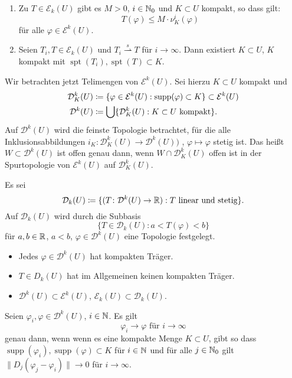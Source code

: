 \documentclass[a4paper,twoside,DIV15,BCOR12mm]{scrbook}
\DeclareMathOperator{\supp}{supp}
\DeclareMathOperator{\spt}{spt}
\begin{document}
\begin{lemma}
\label{lem:4.7}
\begin{enumerate}[\quad(a)]
\item Zu $T\in \mathcal E_k(U)$ gibt es $M>0$, $i\in\mathbb{N}_0$ und $K\subset U$ kompakt, so dass gilt:
\[
T(\varphi) \le M \cdot \nu_K^i (\varphi)
\]
für alle $\varphi\in\mathcal E^k(U)$.
\item Seien $T_i, T \in\mathcal E_k(U)$ und $T_i \stackrel{s}{\rightharpoonup} T$ für $i\to\infty$. Dann existiert $K\subset U$, $K$ kompakt mit $\spt(T_i), \spt(T) \subset K$.
\end{enumerate}
\end{lemma}

Wir betrachten jetzt Telimengen von $\mathcal E^k(U)$. Sei hierzu $K\subset U$ kompakt und
\begin{align*}
\mathcal D_K^k(U) &\da \{\varphi\in\mathcal E^k(U): \supp(\varphi) \subset K\} \subset \mathcal E^k(U) \\
\mathcal D^k(U) &\da \bigcup \{\mathcal D_K^k(U) : K\subset U \text{ kompakt}\}.
\end{align*}
Auf $\mathcal D^k(U)$ wird die feinste Topologie betrachtet, für die alle Inklusionsabbildungen $i_K\colon \mathcal D_K^k(U) \to \mathcal D^k(U))$ , $\varphi\mapsto\varphi$ stetig ist. Das heißt $W\subset \mathcal D^k(U)$ ist offen genau dann, wenn $W\cap \mathcal D_K^k(U)$ offen ist in der Spurtopologie von $\mathcal E^k(U)$ auf $\mathcal D_K^k(U)$.

\begin{definition}
Es sei
\[
\mathcal D_k(U) \da \{ (T\colon \mathcal D^k(U) \to \MdR) : \text{$T$ linear und stetig}\}.
\]
Auf $\mathcal D_k(U)$ wird durch die Subbasis
\[
\{T\in \mathcal D_k(U) : a < T(\varphi) < b\}
\]
für $a,b\in\mathbb{R}$, $a<b$, $\varphi\in\mathcal D^k(U)$ eine Topologie festgelegt.
\end{definition}

\begin{bemerkungenX}
\begin{itemize}
\item Jedes $\varphi\in \mathcal D^k(U)$ hat kompakten Träger.
\item $T\in D_k(U)$ hat im Allgemeinen keinen kompakten Träger.
\item $\mathcal D^k(U) \subset \mathcal E^k(U)$, $\mathcal E_k(U) \subset \mathcal D_k(U)$.
\end{itemize}
\end{bemerkungenX}

\begin{lemma}
\label{lem:4.8}
Seien $\varphi_i, \varphi\in \mathcal D^k(U)$, $i\in \mathbb{N}$. Es gilt
\[
\varphi_i \to \varphi\text{ für }i\to\infty
\]
genau dann, wenn wenn es eine kompakte Menge $K\subset U$, gibt so dass $\supp(\varphi_i), \supp(\varphi) \subset K$ für $i\in \mathbb{N}$ und für alle $j\in\mathbb{N}_0$ gilt $\| D_j(\varphi_j - \varphi_i)\| \to 0$ für $i\to\infty$.
\end{lemma}
\end{document}
